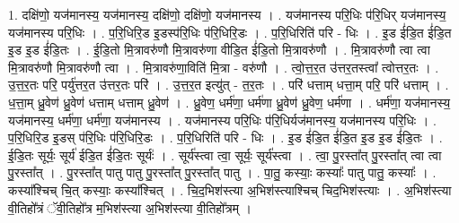 \documentclass[17pt]{extarticle}
\begin{document}
1. दक्षि॑णो॒ यज॑मानस्य॒ यज॑मानस्य॒ दक्षि॑णो॒ दक्षि॑णो॒ यज॑मानस्य । . यज॑मानस्य परि॒धिः प॑रि॒धिर् यज॑मानस्य॒ यज॑मानस्य परि॒धिः । . प॒रि॒धिरि॒ड इ॒डस्प॑रि॒धिः प॑रि॒धिरि॒डः । . प॒रि॒धिरिति॑ परि - धिः । . इ॒ड ई॑डि॒त ई॑डि॒त इ॒ड इ॒ड ई॑डि॒तः । . ई॒डि॒तो मि॒त्रावरु॑णौ मि॒त्रावरु॑णा वीडि॒त ई॑डि॒तो मि॒त्रावरु॑णौ । . मि॒त्रावरु॑णौ त्वा त्वा मि॒त्रावरु॑णौ मि॒त्रावरु॑णौ त्वा । . मि॒त्रावरु॑णा॒विति॑ मि॒त्रा - वरु॑णौ । . त्वो॒त्त॒र॒त उ॑त्तर॒तस्त्वा᳚ त्वोत्तर॒तः । . उ॒त्त॒र॒तः परि॒ पर्यु॑त्तर॒त उ॑त्तर॒तः परि॑ । . उ॒त्त॒र॒त इत्यु॑त् - त॒र॒तः । . परि॑ धत्ताम् धत्ता॒म् परि॒ परि॑ धत्ताम् । . ध॒त्ता॒म् ध्रु॒वेण॑ ध्रु॒वेण॑ धत्ताम् धत्ताम् ध्रु॒वेण॑ । . ध्रु॒वेण॒ धर्म॑णा॒ धर्म॑णा ध्रु॒वेण॑ ध्रु॒वेण॒ धर्म॑णा । . धर्म॑णा॒ यज॑मानस्य॒ यज॑मानस्य॒ धर्म॑णा॒ धर्म॑णा॒ यज॑मानस्य । . यज॑मानस्य परि॒धिः प॑रि॒धिर्यज॑मानस्य॒ यज॑मानस्य परि॒धिः । . प॒रि॒धिरि॒ड इ॒डस् प॑रि॒धिः प॑रि॒धिरि॒डः । . प॒रि॒धिरिति॑ परि - धिः । . इ॒ड ई॑डि॒त ई॑डि॒त इ॒ड इ॒ड ई॑डि॒तः । . ई॒डि॒तः सूर्यः॒ सूर्य॑ ईडि॒त ई॑डि॒तः सूर्यः॑ । . सूर्य॑स्त्वा त्वा॒ सूर्यः॒ सूर्य॑स्त्वा । . त्वा॒ पु॒रस्ता᳚त् पु॒रस्ता᳚त् त्वा त्वा पु॒रस्ता᳚त् । . पु॒रस्ता᳚त् पातु पातु पु॒रस्ता᳚त् पु॒रस्ता᳚त् पातु । . पा॒तु॒ कस्याः॒ कस्याः᳚ पातु पातु॒ कस्याः᳚ । . कस्या᳚श्चिच् चि॒त् कस्याः॒ कस्या᳚श्चित् । . चि॒द॒भिश॑स्त्या अ॒भिश॑स्त्याश्चिच् चिद॒भिश॑स्त्याः । . अ॒भिश॑स्त्या वी॒तिहो᳚त्रं ॅवी॒तिहो᳚त्र म॒भिश॑स्त्या अ॒भिश॑स्त्या वी॒तिहो᳚त्रम् । \newline
\end{document}
